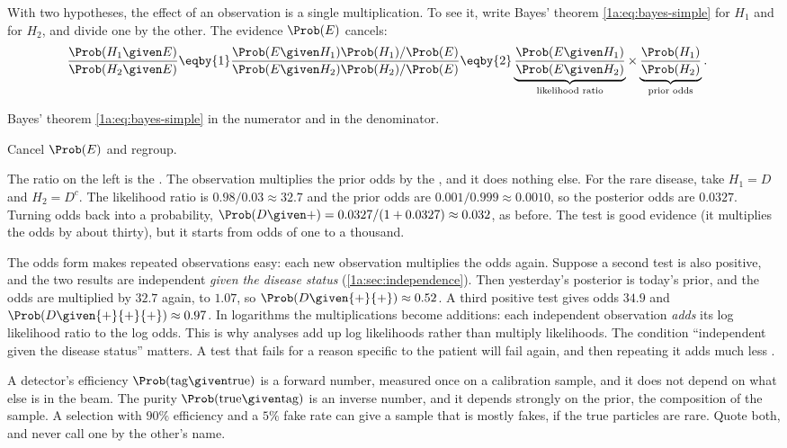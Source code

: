 With two hypotheses, the effect of an observation is a single multiplication.
To see it, write Bayes' theorem \eqref{1a:eq:bayes-simple} for $H_1$ and for $H_2$,
and divide one by the other. The evidence $\Prob(E)$ cancels:
\begin{align}
\frac{\Prob(H_1\given E)}{\Prob(H_2\given E)}
&\eqby{1}\frac{\Prob(E\given H_1)\Prob(H_1)/\Prob(E)}{\Prob(E\given H_2)\Prob(H_2)/\Prob(E)}
 \eqby{2}\underbrace{\frac{\Prob(E\given H_1)}{\Prob(E\given H_2)}}_{\text{likelihood ratio}}
 \times\underbrace{\frac{\Prob(H_1)}{\Prob(H_2)}}_{\text{prior odds}} .
\label{1a:eq:odds}
\end{align}
\begin{explain}
  \item Bayes' theorem \eqref{1a:eq:bayes-simple} in the numerator and in the
        denominator.
  \item Cancel $\Prob(E)$ and regroup.
\end{explain}
The ratio on the left is the . The observation
multiplies the prior odds by the , and it does nothing
else. For the rare disease, take $H_1=D$ and $H_2=D^c$. The likelihood ratio is
$0.98/0.03\approx32.7$ and the prior odds are $0.001/0.999\approx0.0010$, so the
posterior odds are $0.0327$. Turning odds back into a probability,
$\Prob(D\given +)=0.0327/(1+0.0327)\approx0.032$, as before. The test is good
evidence (it multiplies the odds by about thirty), but it starts from odds of one
to a thousand.

The odds form makes repeated observations easy: each new observation multiplies
the odds again. Suppose a second test is also positive, and the two results are
independent \emph{given the disease status} (\cref{1a:sec:independence}). Then
yesterday's posterior is today's prior, and the odds are multiplied by $32.7$
again, to $1.07$, so $\Prob(D\given{+}{+})\approx0.52$. A third positive test
gives odds $34.9$ and $\Prob(D\given{+}{+}{+})\approx0.97$. In logarithms the
multiplications become additions: each independent observation \emph{adds} its
log likelihood ratio to the log odds. This is why analyses add up log
likelihoods rather than multiply likelihoods. The condition ``independent given
the disease status'' matters. A test that fails for a reason specific to the
patient will fail again, and then repeating it adds much less
.

\begin{pitfall}
A detector's efficiency $\Prob(\text{tag}\given\text{true})$ is a forward number,
measured once on a calibration sample, and it does not depend on what else is
in the beam. The purity $\Prob(\text{true}\given\text{tag})$ is an inverse number, and it
depends strongly on the prior, the composition of the sample. A selection
with $90\%$ efficiency and a $5\%$ fake rate can give a sample that is mostly
fakes, if the true particles are rare. Quote both, and never call one by the
other's name.
\end{pitfall}

